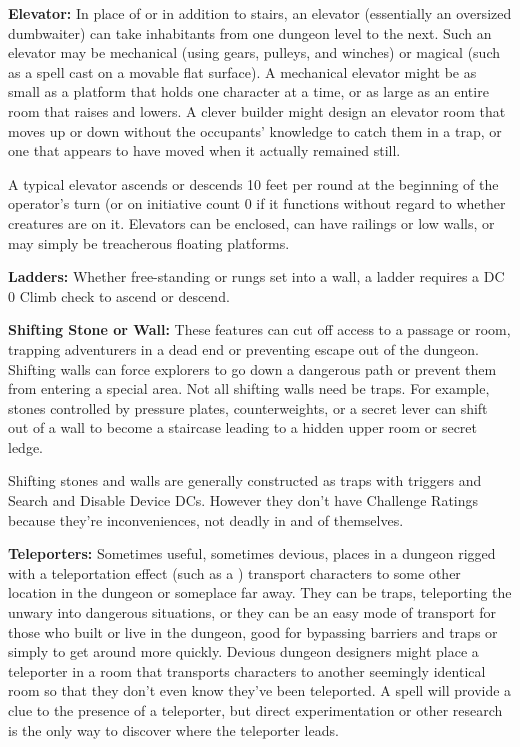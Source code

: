\textbf{Elevator:} In place of or in addition to stairs, an elevator (essentially 
an oversized dumbwaiter) can take inhabitants from one dungeon level to the next. 
Such an elevator may be mechanical (using gears, pulleys, and winches) or magical 
(such as a  spell cast on a movable flat surface). A mechanical 
elevator might be as small as a platform that holds one character at a time, or 
as large as an entire room that raises and lowers. A clever builder might design 
an elevator room that moves up or down without the occupants' knowledge to catch 
them in a trap, or one that appears to have moved when it actually remained still. 

A typical elevator ascends or descends 10 feet per round at the beginning of the 
operator's turn (or on initiative count 0 if it functions without regard to whether 
creatures are on it. Elevators can be enclosed, can have railings or low walls, 
or may simply be treacherous floating platforms.

\textbf{Ladders:} Whether free-standing or rungs set into a wall, a ladder requires 
a DC 0 Climb check to ascend or descend.

\textbf{Shifting Stone or Wall:} These features can cut off access to a passage 
or room, trapping adventurers in a dead end or preventing escape out of the dungeon. 
Shifting walls can force explorers to go down a dangerous path or prevent them 
from entering a special area. Not all shifting walls need be traps. For example, 
stones controlled by pressure plates, counterweights, or a secret lever can shift 
out of a wall to become a staircase leading to a hidden upper room or secret ledge.

Shifting stones and walls are generally constructed as traps with triggers and 
Search and Disable Device DCs. However they don't have Challenge Ratings because 
they're inconveniences, not deadly in and of themselves.

\textbf{Teleporters:} Sometimes useful, sometimes devious, places in a dungeon 
rigged with a teleportation effect (such as a ) transport 
characters to some other location in the dungeon or someplace far away. They can 
be traps, teleporting the unwary into dangerous situations, or they can be an easy 
mode of transport for those who built or live in the dungeon, good for bypassing 
barriers and traps or simply to get around more quickly. Devious dungeon designers 
might place a teleporter in a room that transports characters to another seemingly 
identical room so that they don't even know they've been teleported. A 
spell will provide a clue to the presence of a teleporter, but direct experimentation 
or other research is the only way to discover where the teleporter leads.

